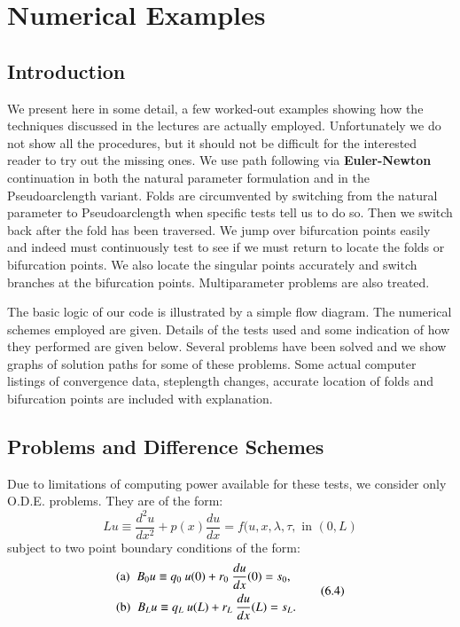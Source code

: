 \chapter{Numerical Examples}\label{chap6}%


\section{Introduction}\label{chap6-sec6.1}\pageoriginale%

We present here in some detail, a few worked-out examples showing how
the techniques discussed in the lectures are actually
employed. Unfortunately we do not show all the procedures, but it
should not be difficult for the interested reader to try out the missing
ones. We use path following via \textbf{Euler-Newton} continuation in
both the natural parameter formulation and in the Pseudoarclength
variant. Folds are circumvented by switching from the natural
parameter to Pseudoarclength when specific tests tell us to do
so. Then we switch back after the fold has been traversed. We jump
over bifurcation points easily and indeed must continuously test to
see if we must return to locate the folds or bifurcation points. We
also locate the singular points accurately and switch branches at the
bifurcation points. Multiparameter problems are also treated. 

The basic logic of our code is illustrated by a simple flow
diagram. The numerical schemes employed are given. Details of the
tests used and some indication of how they performed are given
below. Several problems have been solved and we show graphs of
solution paths for some of these problems. Some actual computer
listings of convergence data, steplength changes, accurate location of
folds and bifurcation points are included with explanation. 


\section{Problems and Difference
  Schemes}\label{chap6-sec6.2}\pageoriginale%
Due to limitations of computing power available for these tests, we
consider only O.D.E. problems. They are of the form: 
\begin{equation*}
Lu \equiv \frac{d^2 u}{dx^2} + p(x) \frac{du}{dx} =
f(u,x,\lambda,\tau, \text{ in } (0,L)\tag{6.3} \label{chap6-eq6.3}
\end{equation*}
subject to two point boundary conditions of the form: 
\begin{equation*}
\begin{aligned}
& {\rm (a)} \;\;  B_0 u \equiv q_0 ~u(0) + r_0 ~\frac{du}{dx} (0) = s_0,\\
& {\rm (b)} \;\;  B_L u \equiv q_L ~u(L) + r_L ~\frac{du}{dx} (L) = s_L. 
\end{aligned}
\tag{6.4}\label{chap6-eq6.4}
\end{equation*}

